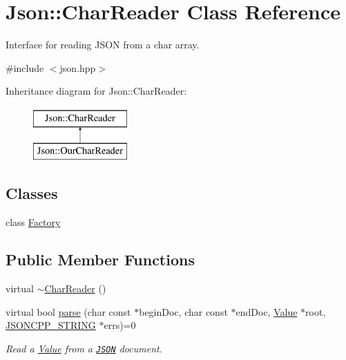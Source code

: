 \hypertarget{classJson_1_1CharReader}{}\section{Json\+:\+:Char\+Reader Class Reference}
\label{classJson_1_1CharReader}


Interface for reading J\+S\+ON from a char array.  




{\ttfamily \#include $<$json.\+hpp$>$}

Inheritance diagram for Json\+:\+:Char\+Reader\+:\begin{figure}[H]
\begin{center}
\leavevmode
\includegraphics[height=2.000000cm]{classJson_1_1CharReader}
\end{center}
\end{figure}
\subsection*{Classes}
\begin{DoxyCompactItemize}
\item 
class \hyperlink{classJson_1_1CharReader_1_1Factory}{Factory}
\end{DoxyCompactItemize}
\subsection*{Public Member Functions}
\begin{DoxyCompactItemize}
\item 
virtual \hyperlink{classJson_1_1CharReader_acaa7b6ad04fe1cf2ddfca06e66550d7e}{$\sim$\+Char\+Reader} ()
\item 
virtual bool \hyperlink{classJson_1_1CharReader_a7983680d50fd0745f371c43b162e78e1}{parse} (char const $\ast$begin\+Doc, char const $\ast$end\+Doc, \hyperlink{classJson_1_1Value}{Value} $\ast$root, \hyperlink{json_8hpp_a1e723f95759de062585bc4a8fd3fa4be}{J\+S\+O\+N\+C\+P\+P\+\_\+\+S\+T\+R\+I\+NG} $\ast$errs)=0
\begin{DoxyCompactList}\small\item\em Read a \hyperlink{classJson_1_1Value}{Value} from a \href{http://www.json.org}{\tt J\+S\+ON} document. \end{DoxyCompactList}\end{DoxyCompactItemize}


